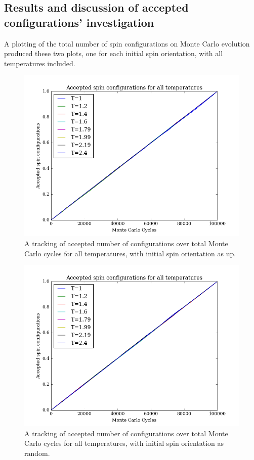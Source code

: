 \documentclass[11pt,a4paper,notitlepage,twocolumn]{article}
\begin{document}
\subsection{Results and discussion of accepted configurations' investigation}\label{disc:accepted}
A plotting of the total number of spin configurations on Monte Carlo evolution produced these two plots, one for each initial spin orientation, with all temperatures included.
\begin{figure}
[H]\center
\includegraphics[scale=0.35]{../figs/4c/acceptedspins_up.png}
\caption{A tracking of accepted number of configurations over total Monte Carlo cycles for all temperatures, with initial spin orientation as up.}
\end{figure}
\begin{figure}
[H]\center
\includegraphics[scale=0.35]{../figs/4c/acceptedspins_random.png}
\caption{A tracking of accepted number of configurations over total Monte Carlo cycles for all temperatures, with initial spin orientation as random.}
\end{figure}
\end{document}
